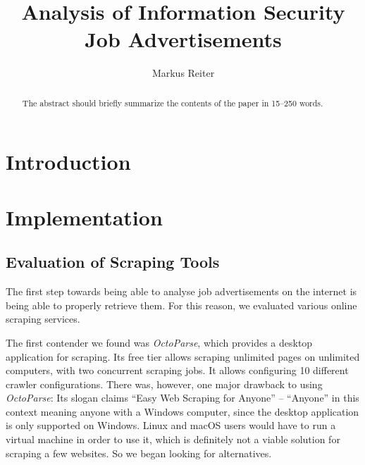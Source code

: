 \documentclass[runningheads]{llncs}
\begin{document}
\title{Analysis of Information Security Job Advertisements}

\author{Markus Reiter}


\maketitle

\newpage

\begin{abstract}
The abstract should briefly summarize the contents of the paper in
15--250 words.


\end{abstract}

\newpage

\section{Introduction}
\label{sec:introduction}


\section{Implementation}

\subsection{Evaluation of Scraping Tools}
\label{sub:evaluation_of_scraping_tools}

The first step towards being able to analyse job advertisements on the internet is being able to properly retrieve them. For this reason, we evaluated various online scraping services.

The first contender we found was \textit{OctoParse}, which provides a desktop application for scraping. Its free tier allows scraping unlimited pages on unlimited computers, with two concurrent scraping jobs. It allows configuring 10 different crawler configurations. There was, however, one major drawback to using \textit{OctoParse}: Its slogan claims “Easy Web Scraping for Anyone” – “Anyone” in this context meaning anyone with a Windows computer, since the desktop application is only supported on Windows. Linux and macOS users would have to run a virtual machine in order to use it, which is definitely not a viable solution for scraping a few websites. So we began looking for alternatives.
\end{document}

